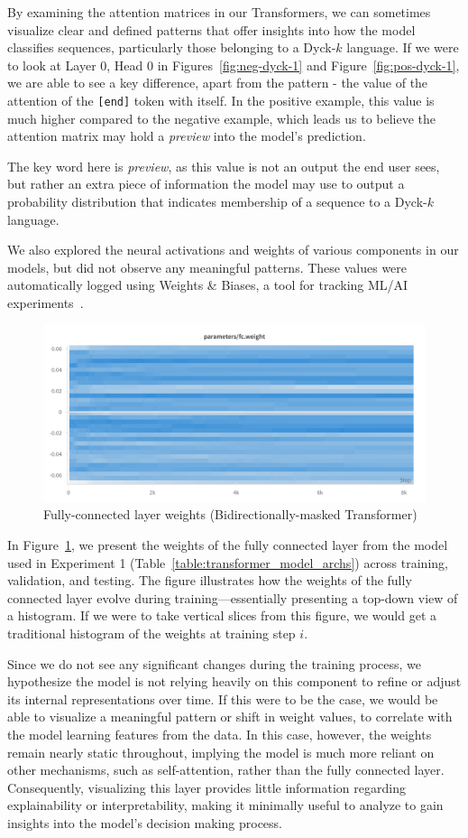 By examining the attention matrices in our Transformers, we can sometimes visualize clear and defined patterns that offer insights into how the model classifies sequences, particularly those belonging to a Dyck-$k$ language. If we were to look at Layer 0, Head 0 in Figures~\ref{fig:neg-dyck-1} and Figure~\ref{fig:pos-dyck-1}, we are able to see a key difference, apart from the pattern - the value of the attention of the \verb|[end]| token with itself. In the positive example, this value is much higher compared to the negative example, which leads us to believe the attention matrix may hold a \emph{preview} into the model's prediction.

The key word here is \emph{preview}, as this value is not an output the end user sees, but rather an extra piece of information the model may use to output a probability distribution that indicates membership of a sequence to a Dyck-$k$ language.

We also explored the neural activations and weights of various components in our models, but did not observe any meaningful patterns. These values were automatically logged using Weights \& Biases, a tool for tracking ML/AI experiments~\cite{wandb}.

\begin{figure}[h!]
    \centering
    \includegraphics[width=0.7\linewidth]{docs/figs/fc_weights.png}
    \caption{Fully-connected layer weights (Bidirectionally-masked Transformer)}
    \label{fig:fc-weights}
\end{figure}

In Figure~\ref{fig:fc-weights}, we present the weights of the fully connected layer from the model used in Experiment 1 (Table~\ref{table:transformer_model_archs}) across training, validation, and testing. The figure illustrates how the weights of the fully connected layer evolve during training—essentially presenting a top-down view of a histogram. If we were to take vertical slices from this figure, we would get a traditional histogram of the weights at training step $i$.

Since we do not see any significant changes during the training process, we hypothesize the model is not relying heavily on this component to refine or adjust its internal representations over time. If this were to be the case, we would be able to visualize a meaningful pattern or shift in weight values, to correlate with the model learning features from the data. In this case, however, the weights remain nearly static throughout, implying the model is much more reliant on other mechanisms, such as self-attention, rather than the fully connected layer. Consequently, visualizing this layer provides little information regarding explainability or interpretability, making it minimally useful to analyze to gain insights into the model's decision making process.

